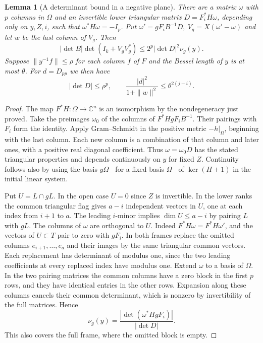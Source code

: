 \documentclass[a4paper,11pt]{article}
\newtheorem{lemma}[proposition]{Lemma}
\theoremstyle{definition}
\theoremstyle{remark}
\numberwithin{equation}{section}
\begin{document}
\begin{lemma}[A determinant bound in a negative plane]\leavevmode
\label{lem:negdet692}
There are a matrix \(\omega\) with \(p\) columns in \(\Omega\)
and an invertible lower triangular matrix \(D=F_i^*H\omega\),
depending only on \(y,Z,i\), such that \(\omega^*H\omega=-I_p\).
Put \(\omega'=gF_iB^{-1}D,\ V_g=X(\omega'-\omega)\) and let
\(w\) be the last column of \(V_g\). Then
\[
       |\det B|\det(I_k+V_gV_g^*)\le 2^p|\det D|^2\nu_g(y).
\]
Suppose \(\|y^{-1}f\|\le\rho\) for each column \(f\) of \(F\)
and the Bessel length of \(y\) is at most \(\theta\).
For \(d=D_{pp}\) we then have
\[
        |\det D|\le\rho^p,\qquad
        \frac{|d|^2}{1+\|w\|^2}\le\theta^{2(j-i)} .
\]
\end{lemma}
\begin{proof}
The map \(F^*H:\Omega\to\mathbb C^n\) is an isomorphism by the
nondegeneracy just proved. Take the preimages \(\omega_0\) of
the columns of \(F^*HgF_iB^{-1}\). Their pairings with \(F_i\)
form the identity. Apply Gram--Schmidt in the positive metric
\(-h|_{\Omega}\), beginning with the last column. Each new
column is a combination of that column and later ones, with a
positive real diagonal coefficient. Thus \(\omega=\omega_0 D\)
has the stated triangular properties and depends continuously
on \(y\) for fixed \(Z\). Continuity follows also by using the
basis \(y\Omega_-\) for a fixed basis \(\Omega_-\) of
\(\ker(H+1)\) in the initial linear system.

Put \(U=L\cap gL\). In the open case \(U=0\) since \(Z\) is
invertible. In the lower ranks the common triangular flag gives
\(a-i\) independent vectors in \(U\), one at each index from
\(i+1\) to \(a\). The leading \(i\)-minor implies
\(\dim U\le a-i\) by pairing \(L\) with \(gL\).
The columns of \(\omega\) are orthogonal to \(U\).
Indeed \(F^*H\omega=F^*H\omega'\), and the vectors of
\(U\subset T\) pair to zero with \(gF_i\). In both frames
replace the omitted columns \(e_{i+1},\ldots,e_a\) and their
images by the same triangular common vectors. Each replacement
has determinant of modulus one, since the two leading
coefficients at every replaced index have modulus one. Extend
\(\omega\) to a basis of \(\Omega\). In the two pairing
matrices the common columns have a zero block in the first
\(p\) rows, and they have identical entries in the other rows.
Expansion along these columns cancels their common determinant,
which is nonzero by invertibility of the full matrices. Hence
\[
              \nu_g(y)=
           \frac{|\det(\omega^*HgF_i)|}{|\det D|}.
\]
This also covers the full frame, where the omitted block is empty.


\end{proof}
\end{document}
